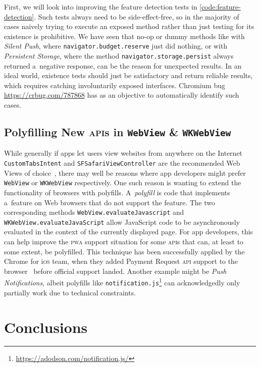 \documentclass[sigconf]{acmart}
\begin{document}
First, we will look into improving the feature detection tests in
\autoref{code:feature-detection}.
Such tests always need to be side-effect-free,
so in the majority of cases naively trying to execute an exposed method
rather than just testing for its existence is prohibitive.
We have seen that no-op or dummy methods like with \emph{Silent Push},
where \texttt{navigator.budget.reserve} just did nothing,
or with \emph{Persistent Storage}, 
where the method \texttt{navigator.storage.persist} always returned a~negative response,
can be the reason for unexpected results.
In an ideal world, existence tests should just be satisfactory and return reliable results,
which requires catching involuntarily exposed interfaces.
Chromium bug \url{https://crbug.com/787868} has as an objective
to automatically identify such cases.

\subsection{Polyfilling New \textsc{api}s in \texttt{WebView} \& \texttt{WKWebView}}

While generally if apps let users view websites from anywhere on the Internet
\texttt{CustomTabsIntent} and \texttt{SFSafariViewController}
are the recommended Web Views of choice~\cite{apple2018sfsafariviewcontroller,kinlan2016customtabs},
there may well be reasons where app developers might prefer \texttt{WebView}
or \texttt{WKWebView} respectively.
One such reason is wanting to extend the functionality of browsers with polyfills.
A~\emph{polyfill} is code that implements a~feature on Web browsers
that do not support the feature.
The two corresponding methods \texttt{WebView.evaluateJavascript} and \texttt{WKWebView.evaluateJavaScript}
allow JavaScript code to be 
asynchronously evaluated in the context of the currently displayed page.
For app developers, this can help improve
the \textsc{pwa} support situation for some \textsc{api}s
that can, at least to some extent, be polyfilled.
This technique has been successfully applied by the Chrome for i\textsc{os} team,
when they added Payment Request \textsc{api} support to the browser~\cite{leenheer2017paymentrequest}
before official support landed.
Another example might be \emph{Push Notifications},
albeit polyfills like \texttt{notification.js}\footnote{\url{https://adodson.com/notification.js/}} 
can acknowledgedly only partially work due to technical constraints.

\section{Conclusions}
\label{sec:conclusions}
\end{document}
